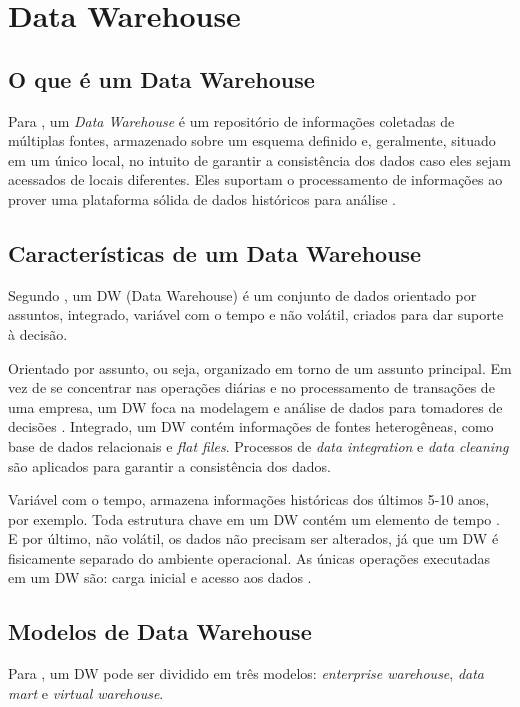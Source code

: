 \section{ Data Warehouse}
\subsection{O que é um Data Warehouse}
Para , um \textit{Data Warehouse} é um repositório de informações coletadas de múltiplas fontes, armazenado sobre um esquema definido e, geralmente, situado em um único local, no intuito de garantir a consistência dos dados caso eles sejam acessados de locais diferentes. Eles suportam o processamento de informações ao prover uma plataforma sólida de dados históricos para análise \citep{jmj}.

\subsection{Características de um Data Warehouse}
Segundo , um DW (Data Warehouse) é um conjunto de dados orientado por assuntos, integrado, variável com o tempo e não volátil, criados para dar suporte à decisão.

Orientado por assunto, ou seja, organizado em torno de um assunto principal. Em vez de se concentrar nas operações diárias e no processamento de transações de uma empresa, um DW foca na modelagem e análise de dados para tomadores de decisões \citep{jmj}.
Integrado, um DW contém informações de fontes heterogêneas, como base de dados relacionais e \textit{flat files}. Processos de \textit{data integration} e \textit{data cleaning} são aplicados para garantir a consistência dos dados.

Variável com o tempo, armazena informações históricas dos últimos 5-10 anos, por exemplo. Toda estrutura chave em um DW contém um elemento de tempo \citep{jmj}.
E por último, não volátil, os dados não precisam ser alterados, já que um DW é fisicamente separado do ambiente operacional. As únicas operações executadas em um DW são: carga inicial e acesso aos dados \citep{jmj}.

\subsection{Modelos de Data Warehouse}
Para , um DW pode ser dividido em três modelos: \textit{enterprise warehouse}, \textit{data mart} e \textit{virtual warehouse}.

